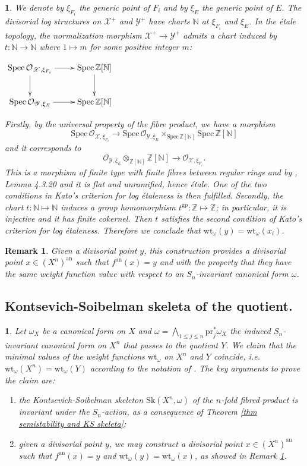 \documentclass{amsart}%
\numberwithin{equation}{subsection}
\theoremstyle{plain2}
\theoremstyle{definition2}
\newtheorem{rem}[equation]{Remark}
\theoremstyle{stepstyle}
\theoremstyle{point}
\theoremstyle{subpoint}
\newtheorem{subpoint}[equation]{}%
\newcommand{\spa}[1]{\begin{subpoint}#1\end{subpoint}}           %
\newcommand{\N}{\ensuremath{\mathbb{N}}}
\newcommand{\Z}{\ensuremath{\mathbb{Z}}}
\newcommand{\cX}{\ensuremath{\mathscr{X}}}
\newcommand{\caO}{\ensuremath{\mathcal{O}}}
\newcommand{\cY}{\ensuremath{\mathscr{Y}}}
\renewcommand{\cY}{\ensuremath{\mathscr{Y}}}
\newcommand{\Spec}{\ensuremath{\mathrm{Spec}\,}}
\newcommand{\pr}{\mathrm{pr}}
\newcommand{\an}{\mathrm{an}}
\newcommand{\weight}{\mathrm{wt}}
\newcommand{\Sk}{\mathrm{Sk}}
\begin{document}
\spa{We denote by $\xi_{F_i}$ the generic point of $F_i$ and by $\xi_E$ the generic point of $E$. The divisorial log structures on $\cX^+$ and $\cY^+$ have charts $\N$ at $\xi_{F_i}$ and $\xi_E$. In the \'{e}tale topology, the normalization morphism $\cX^+ \rightarrow \cY^+$ admits a chart induced by $t:\N \rightarrow \N$ where $1 \mapsto m$ for some positive integer $m$:
\begin{center}
$\xymatrix{
\Spec \caO_{\cX, \xi_{F_i}} \ar[d] \ar[r] & \Spec \Z[\N] \ar[d] \\
\Spec \caO_{\cY, \xi_{E}}  \ar[r] & \Spec \Z[\N] 
}$
\end{center} Firstly, by the universal property of the fibre product, we have a morphism $$\Spec \caO_{\cX, \xi_{F_i}} \rightarrow \Spec \caO_{\cY, \xi_{E}} \times_{\Spec \Z[\N] } \Spec \Z[\N]$$ and it corresponds to $$ \caO_{\cY, \xi_{E}}  \otimes_{\Z[\N]} \Z[\N] \rightarrow\caO_{\cX, \xi_{F_i}}.$$ This is a morphism of finite type with finite fibres between regular rings and by \cite{Liu2002}, Lemma 4.3.20 and \cite{Nowak} it is flat and unramified, hence \'{e}tale. One of the two conditions in Kato's criterion for log \'{e}taleness is then fulfilled. Secondly, the chart $t:\N \mapsto \N$ induces a group homomorphism $t^{\text{gp}}: \Z \mapsto \Z$; in particular, it is injective and it has finite cokernel. Then $t$ satisfies the second condition of Kato's criterion for log \'{e}taleness. Therefore we conclude that $\weight_\omega(y)=\weight_\omega(x_i)$.}


\begin{rem} \label{rem construction div points}
Given a divisorial point $y$, this construction provides a divisorial point $x \in (X^n)^\an$ such that $f^\an(x)=y$ and with the property that they have the same weight function value with respect to an $S_n$-invariant canonical form $\omega$.
\end{rem}

\subsection{Kontsevich-Soibelman skeleta of the quotient.}
\spa{Let $\omega_X$ be a canonical form on $X$ and $\omega= \bigwedge_{1\leqslant j \leqslant n} \pr_j^*\omega_X$ the induced $S_n$-invariant canonical form on $X^n$ that passes to the quotient $Y$. We claim that the minimal values of the weight functions $\weight_\omega$ on $X^n$ and $Y$ coincide, i.e. $\weight_\omega(X^n)= \weight_\omega(Y)$ according to the notation of \cite{MustataNicaise}. The key arguments to prove the claim are:\begin{enumerate}
\item \label{argument 1}the Kontsevich-Soibelman skeleton $\Sk(X^n,\omega)$ of the $n$-fold fibred product is invariant under the $S_n$-action, as a consequence of Theorem \ref{thm semistability and KS skeleta};
\item \label{argument 2} given a divisorial point $y$, we may construct a divisorial point $x \in (X^n)^\an$ such that $f^\an(x)=y$ and $\weight_{\omega}(y)= \weight_{\omega}(x)$, as showed in Remark \ref{rem construction div points}.
\end{enumerate}
}
\end{document}
